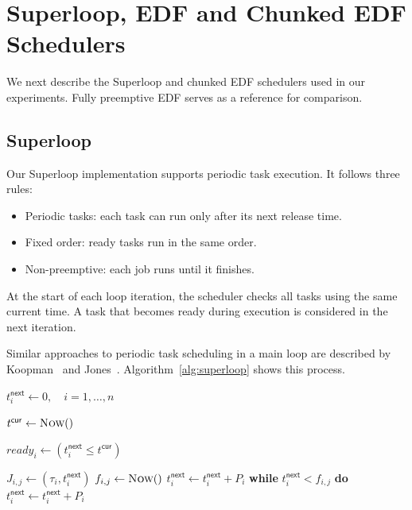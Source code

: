 \documentclass[conference]{IEEEtran}
\begin{document}
\section{Superloop, EDF and Chunked EDF Schedulers}
\label{sec:schedulers}

We next describe the Superloop and chunked EDF schedulers used in our experiments. Fully preemptive EDF serves as a reference for comparison.

\subsection{Superloop}
\label{sec:superloop}

Our Superloop implementation supports periodic task execution. It follows three rules:
%
\begin{itemize}
	\item Periodic tasks: each task can run only after its next release time.
	\item Fixed order: ready tasks run in the same order.
	\item Non-preemptive: each job runs until it finishes.
\end{itemize}

At the start of each loop iteration, the scheduler checks all tasks using the same current time. A task that becomes ready during execution is considered in the next iteration.

Similar approaches to periodic task scheduling in a main loop are described by Koopman~\cite{Koopman2015MultiRate} and Jones~\cite{Jones2024RTOSPart1}. Algorithm~\ref{alg:superloop} shows this process.

%
\begin{algorithm}[!b]
	\caption{Superloop Scheduler}
	\label{alg:superloop}
	\begin{algorithmic}[1]
		\State $t_i^{\mathsf{next}} \gets 0,\quad i=1,\ldots,n$
		
		\State $t^{\mathsf{cur}} \gets \textproc{Now}()$
		
		\State $\mathit{ready}_i \gets (t_i^{\mathsf{next}} \leq t^{\mathsf{cur}})$
		\EndFor
		
		\State $J_{i,j} \gets
		(\tau_i,t_i^{\mathsf{next}})$
		\State {}
		\State $f_{i,j} \gets \textproc{Now}()$
		\State $t_i^{\mathsf{next}} \gets
		t_i^{\mathsf{next}}+P_i$
		\State \textbf{while}
		$t_i^{\mathsf{next}}<f_{i,j}$
		\textbf{do}
		$t_i^{\mathsf{next}}\gets
		t_i^{\mathsf{next}}+P_i$
		\EndIf
		\EndFor
		\EndWhile
		\EndFunction
	\end{algorithmic}
\end{algorithm}
\end{document}
